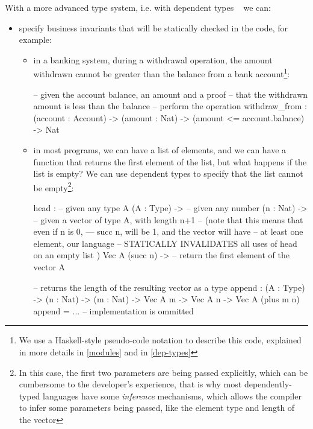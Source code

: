 With a more advanced type system, i.e. with dependent types ~\cite{advancedtapl} we can:
\begin{itemize}

       \item specify business invariants that will be statically checked in the code, for example:
       \begin{itemize}
              \item in a banking system, during a withdrawal operation, the amount withdrawn cannot be greater than the balance from a bank account\footnote{We use a Haskell-style pseudo-code notation to describe this code, explained in more details in \autoref{modules} and in \autoref{dep-types}}:
             \begin{piforall}
-- given the account balance, an amount and a proof
-- that the withdrawn amount is less than the balance
-- perform the operation
withdraw_from :
       (account : Account) ->
       (amount : Nat) ->
       (amount <= account.balance) ->
       Nat
             \end{piforall}
             \item in most programs, we can have a list of elements, and we can have a function that returns the first element of the list, but what happens if the list is empty? We can use dependent types to specify that the list cannot be empty\footnote{In this case, the first two parameters are being passed explicitly, which can be cumbersome to the developer's experience, that is why most dependently-typed languages have some \emph{inference} mechanisms, which allows the compiler to infer some parameters being passed, like the element type and length of the vector}:
             \begin{piforall}

head :
       -- given any type A
       (A : Type) ->
       -- given any number
       (n : Nat) ->
       -- given a vector of type A, with length n+1
       -- (note that this means that even if n is 0,
       --- succ n, will be 1, and the vector will have
       -- at least one element, our language
       -- STATICALLY INVALIDATES  all uses of head on an empty list )
       Vec A (succ n) ->
       -- return the first element of the vector
       A

-- returns the length of the resulting vector as a type
append : (A : Type) -> (n : Nat) -> (m : Nat) -> Vec A m -> Vec A n -> Vec A (plus m n)
append = ... -- implementation is ommitted
             \end{piforall}
       \end{itemize}


\end{itemize}
